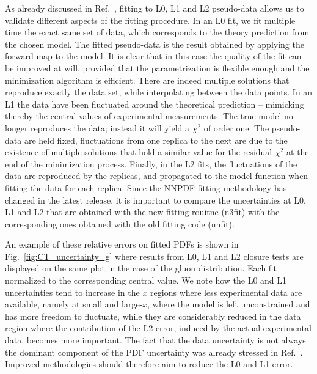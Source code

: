 As already discussed in Ref.~\cite{nnpdf30}, fitting to L0, L1 and L2
pseudo-data allows us to validate different aspects of the fitting procedure. In
an L0 fit, we fit multiple time the exact same set of data, which corresponds to
the theory prediction from the chosen model. The fitted pseudo-data is the
result obtained by applying the forward map to the model. It is clear that in
this case the quality of the fit can be improved at will, provided that the
parametrization is flexible enough and the minimization algorithm is efficient.
There are indeed multiple solutions that reproduce exactly the data set, while
interpolating between the data points. In an L1 the data have been fluctuated
around the theoretical prediction -- mimicking thereby the central values of
experimental measurements. The true model no longer reproduces the data; instead
it will yield a $\chi^2$ of order one. The pseudo-data are held fixed,
fluctuations from one replica to the next are due to the existence of multiple
solutions that hold a similar value for the residual $\chi^2$ at the end of the
minimization process. Finally, in the L2 fits, the fluctuations of the data are
reproduced by the replicas, and propagated to the model function when fitting
the data for each replica. Since the NNPDF fitting methodology has changed in
the latest release, it is important to compare the uncertainties at L0, L1 and
L2 that are obtained with the new fitting rouitne (n3fit) with the corresponding
ones obtained with the old fitting code (nnfit). 

An example of these relative errors on fitted PDFs is shown in Fig.~\ref{fig:CT_uncertainty_g} 
where results from L0, L1 and L2 closure tests are displayed on the same plot in the case of the gluon distribution.
Each fit normalized to the corresponding central value. 
We note how the L0 and L1 uncertainties tend to increase in the $x$ regions where less experimental data are available,
namely at small and large-$x$, where the model is left unconstrained and has more freedom to fluctuate,
while they are considerably reduced in the data region 
where the contribution of the L2 error, induced by the actual experimental data, becomes more important.
The fact that the data uncertainty is not always the dominant component of the PDF uncertainty
was already stressed in Ref.~\cite{nnpdf30}. Improved methodologies should therefore aim to reduce the L0 and L1
error. 

